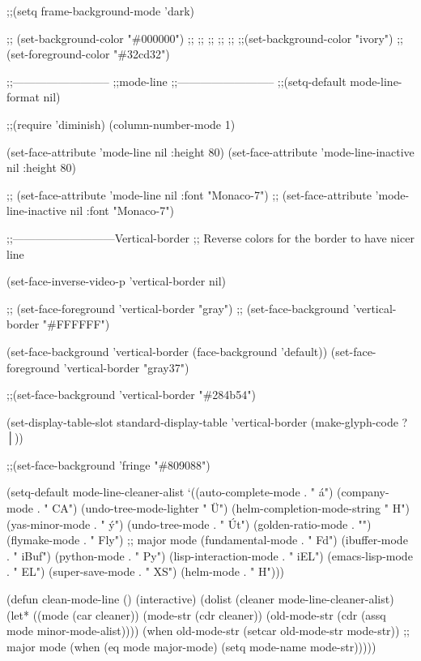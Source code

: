 \documentclass[presentation]{beamer}
\begin{document}
;;(setq frame-background-mode 'dark)

;; (set-background-color "\#000000")
;; ;; ;; ;; ;; ;;(set-background-color "ivory")
;; (set-foreground-color "\#32cd32")

;;--------------------------
;;mode-line
;;--------------------------
;;(setq-default mode-line-format nil)


;;(require 'diminish)
(column-number-mode 1)

(set-face-attribute 'mode-line nil  :height 80)
(set-face-attribute 'mode-line-inactive nil  :height 80)

;; (set-face-attribute 'mode-line nil :font "Monaco-7")
;; (set-face-attribute 'mode-line-inactive nil :font "Monaco-7")

;;---------------------------Vertical-border
;; Reverse colors for the border to have nicer line  

(set-face-inverse-video-p 'vertical-border nil)

;; (set-face-foreground 'vertical-border "gray")
;; (set-face-background 'vertical-border "\#FFFFFF")


(set-face-background 'vertical-border (face-background 'default))
(set-face-foreground 'vertical-border "gray37")

;;(set-face-background 'vertical-border "\#284b54")

(set-display-table-slot standard-display-table
                        'vertical-border 
                        (make-glyph-code ?│))

;;(set-face-background 'fringe "\#809088")

(setq-default mode-line-cleaner-alist
              `((auto-complete-mode . " á")
                (company-mode . " CA")
                (undo-tree-mode-lighter " Ü")
                (helm-completion-mode-string " H")
                (yas-minor-mode . " ý")
                (undo-tree-mode . " Út")
                (golden-ratio-mode . "")
                (flymake-mode . " Fly")
                ;; major mode
                (fundamental-mode . " Fd")
                (ibuffer-mode . " iBuf")
                (python-mode . " Py")
                (lisp-interaction-mode . " iEL")
                (emacs-lisp-mode . " EL")
                (super-save-mode . " XS")
		(helm-mode . " H")))

(defun clean-mode-line ()
  (interactive)
  (dolist (cleaner mode-line-cleaner-alist)
    (let* ((mode (car cleaner))
           (mode-str (cdr cleaner))
           (old-mode-str (cdr (assq mode minor-mode-alist))))
      (when old-mode-str
        (setcar old-mode-str mode-str))
      ;; major mode
      (when (eq mode major-mode)
        (setq mode-name mode-str)))))
\end{document}
